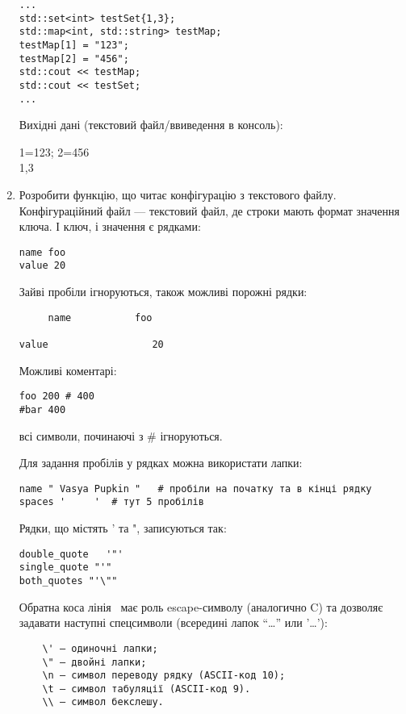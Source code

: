 \documentclass[]{article}
\begin{document}
\begin{enumerate}
\begin{verbatim}
...
std::set<int> testSet{1,3};
std::map<int, std::string> testMap;
testMap[1] = "123";
testMap[2] = "456";
std::cout << testMap;
std::cout << testSet;
...
\end{verbatim}

  Вихідні дані (текстовий файл/ввиведення в консоль):

  1=123; 2=456\\
  1,3

\item
  Розробити функцію, що читає конфігурацію з текстового файлу.
  Конфігураційний файл --- текстовий файл, де строки мають формат
  значення ключа. І ключ, і значення є рядками:

\begin{verbatim}
name foo
value 20
\end{verbatim}

  Зайві пробіли ігноруються, також можливі порожні рядки:

\begin{verbatim}
     name           foo

value                  20
\end{verbatim}

  Можливі коментарі:

\begin{verbatim}
foo 200 # 400
#bar 400
\end{verbatim}

  всі символи, починаючі з \# ігноруються.

  Для задання пробілів у рядках можна використати лапки:

\begin{verbatim}
name " Vasya Pupkin "   # пробіли на початку та в кінці рядку
spaces '     '  # тут 5 пробілів
\end{verbatim}

  Рядки, що містять ' та ", записуються так:

\begin{verbatim}
double_quote   '"'
single_quote "'"
both_quotes "'\""
\end{verbatim}

  Обратна коса лінія ~має роль escape-символу (аналогично C) та дозволяє
  задавати наступні спецсимволи (всередині лапок ``\ldots{}'' или
  '\ldots{}'):

\begin{verbatim}
    \' – одиночні лапки;
    \" – двойні лапки;
    \n – символ переводу рядку (ASCII-код 10);
    \t – символ табуляції (ASCII-код 9).
    \\ — символ бекслешу.
\end{verbatim}


\end{enumerate}
\end{document}
